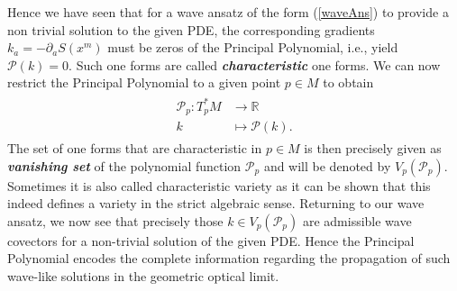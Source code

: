 Hence we have seen that for a wave ansatz of the form (\ref{waveAns}) to provide a non trivial solution to the given PDE, the corresponding gradients $k_a = - \partial_aS(x^m)$ must be zeros of the Principal Polynomial, i.e., yield $\mathcal{P}(k) = 0$.
Such one forms are called \textit{\textbf{characteristic}} one forms. We can now restrict the Principal Polynomial to a given point $p \in M$ to obtain 
\begin{align}
    \begin{aligned}
    \mathcal{P}_p : T^{\ast}_pM &\longrightarrow \mathbb{R}\\
    k &\longmapsto \mathcal{P}(k).
    \end{aligned}
\end{align}
The set of one forms that are characteristic in $p \in M$ is then precisely given as \textbf{\textit{vanishing set}} of the polynomial function $\mathcal{P}_p$ and will be denoted by $V_p(\mathcal{P}_p)$. Sometimes it is also called characteristic variety as it can be shown that this indeed defines a variety in the strict algebraic sense. Returning to our wave ansatz, we now see that precisely those $k \in V_p(\mathcal{P}_p)$ are admissible wave covectors for a non-trivial solution of the given PDE. Hence the Principal Polynomial encodes the complete information regarding the propagation of such wave-like solutions in the geometric optical limit.

